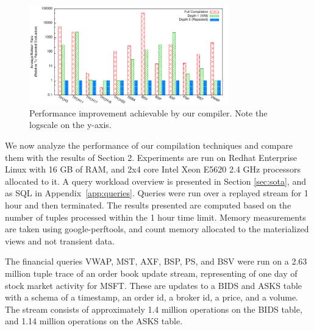 
\newcommand{\figurewidth}[0]{1.8in}

\newcommand{\tablefig}[1]{
  \hspace*{-0.25in}
  \texttt{[image: ../graphs/graphs/\#1]}
}

\begin{figure}
\begin{center}
\includegraphics[width=3.4in]{../graphs/graphs/bakeoff.pdf}
\caption{Performance improvement achievable by our compiler.  Note the logscale on the y-axis. }
\label{fig:experiments:bakeoff}
\end{center}
\vspace*{-0.3in}
\end{figure}

We now analyze the performance of our compilation techniques and compare them with the results of Section 2.  Experiments are run on Redhat Enterprise Linux with 16 GB of RAM, and 2x4 core Intel Xeon E5620 2.4 GHz processors allocated to it.
A query workload overview is presented in Section \ref{sec:sota}, and as SQL in Appendix~\ref{app:queries}.
Queries were run over a replayed stream for 1 hour and then terminated. The results presented are computed based on the number of tuples processed within the 1 hour time limit.
Memory measurements are taken using google-perftools, and count memory allocated to the materialized views and not transient data.  

The financial queries VWAP, MST, AXF, BSP, PS, and BSV were run on a 2.63 million tuple trace of an order book update stream, representing of one day of stock market activity for MSFT.  These are updates to a BIDS and ASKS table with a schema of a timestamp, an order id, a broker id, a price, and a volume.  The stream consists of approximately 1.4 million operations on the BIDS table, and 1.14 million operations on the ASKS table.  

